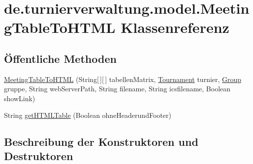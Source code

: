 \hypertarget{classde_1_1turnierverwaltung_1_1model_1_1_meeting_table_to_h_t_m_l}{}\section{de.\+turnierverwaltung.\+model.\+Meeting\+Table\+To\+H\+T\+ML Klassenreferenz}
\label{classde_1_1turnierverwaltung_1_1model_1_1_meeting_table_to_h_t_m_l}
\subsection*{Öffentliche Methoden}
\begin{DoxyCompactItemize}
\item 
\hyperlink{classde_1_1turnierverwaltung_1_1model_1_1_meeting_table_to_h_t_m_l_a014c132bb21556a181adf3c3e6a41648}{Meeting\+Table\+To\+H\+T\+ML} (String\mbox{[}$\,$\mbox{]}\mbox{[}$\,$\mbox{]} tabellen\+Matrix, \hyperlink{classde_1_1turnierverwaltung_1_1model_1_1_tournament}{Tournament} turnier, \hyperlink{classde_1_1turnierverwaltung_1_1model_1_1_group}{Group} gruppe, String web\+Server\+Path, String filename, String icsfilename, Boolean show\+Link)
\item 
String \hyperlink{classde_1_1turnierverwaltung_1_1model_1_1_meeting_table_to_h_t_m_l_ad12c678b10f82ba9dc219fe467cab63c}{get\+H\+T\+M\+L\+Table} (Boolean ohne\+Headerund\+Footer)
\end{DoxyCompactItemize}


\subsection{Beschreibung der Konstruktoren und Destruktoren}
